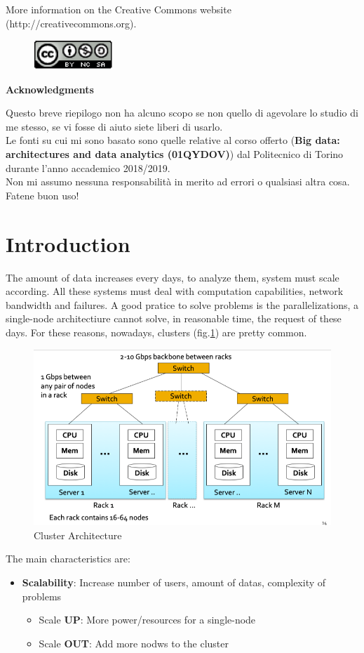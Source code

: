\documentclass[12pt]{article}
\begin{document}
\noindent More information on the Creative Commons website (http://creativecommons.org).

\begin{figure}[h!]
  \centering
  \includegraphics[width=3cm]{images/license.png}
\end{figure}

{\noindent \Large \textbf{Acknowledgments}\bigskip}

Questo breve riepilogo non ha alcuno scopo se non quello di agevolare lo studio di me stesso, se vi fosse di aiuto siete liberi di usarlo.\\
Le fonti su cui mi sono basato sono quelle relative al corso offerto (\textbf{Big data: architectures and data analytics (01QYDOV)}) dal Politecnico di Torino durante l'anno accademico 2018/2019.\\
Non mi assumo nessuna responsabilità in merito ad errori o qualsiasi altra cosa. Fatene buon uso!
\newpage

\section{Introduction}
The amount of data increases every days, to analyze them, system must scale according. All these systems must deal with computation capabilities, network bandwidth and failures. A good pratice to solve problems is the parallelizations, a single-node architectiure cannot solve, in reasonable time, the request of these days. For these reasons, nowadays, clusters (fig.\ref{fig:cluster}) are pretty common.
\begin{figure}[H]
  \includegraphics[width=\linewidth]{images/cluster.png}
  \caption{Cluster Architecture}
  \label{fig:cluster}
\end{figure}
The main characteristics are:
\begin{itemize}
  \item \textbf{Scalability}: Increase number of users, amount of datas, complexity of problems
  \begin{itemize}
    \item Scale \textbf{UP}: More power/resources for a single-node
    \item Scale \textbf{OUT}: Add more nodws to the cluster
  \end{itemize}
\end{itemize}
\end{document}
